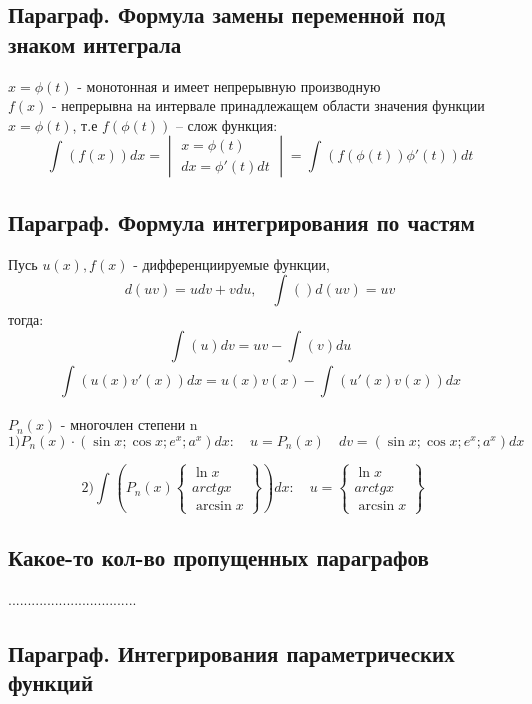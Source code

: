 \documentclass[a4paper, 12pt]{article}
\begin{document}
\subsection{Параграф. Формула замены переменной под знаком интеграла}
$ x = \phi (t) $ - монотонная и имеет непрерывную производную\\
$ f(x) $ - непрерывна на интервале принадлежащем области значения функции $ x = \phi (t) $, т.е $ f(\phi (t)) $ -- слож функция:
\[
      \int_{}^{}\left(f(x)\right)dx = \begin{vmatrix}
    x = \phi (t)\\
    dx = \phi' (t) dt
  \end{vmatrix} = \int_{}^{}\left(f(\phi (t))\phi'(t)\right)dt 
\]    


\subsection{Параграф. Формула интегрирования по частям}

Пусь $ u(x),f(x) $ -  дифференциируемые  функции, \[
  d(uv) = u dv + v du, \quad \int_{}^{}\left(\right)d(uv) = uv 
\]
тогда: \[
  \int_{}^{}\left(u\right)dv = u v - \int_{}^{}\left(v\right)du 
\]
\[
  \int_{}^{}\left(u(x)v'(x)\right)dx = u(x)v(x) - \int_{}^{}\left(u'(x)v(x)\right)dx 
\]

$ P_n(x) $ - многочлен степени n\\
\[
   1)P_n(x)\cdot (\sin x;\cos x;e^x;a^x)dx: \quad u = P_n(x) \quad dv = (\sin x;\cos x;e^x;a^x)dx
 \] 

\[
  2)\int_{}^{}\left(P_n(x)\begin{Bmatrix}
    \ln x \\
    arctg x\\
    \arcsin x
  \end{Bmatrix}\right)dx: \quad u = \begin{Bmatrix}
    \ln x \\
    arctg x\\
    \arcsin x
  \end{Bmatrix} \quad  
\]

\subsection{Какое-то кол-во пропущенных параграфов}

.................................


\subsection{Параграф. Интегрирования параметрических функций}
\end{document}
